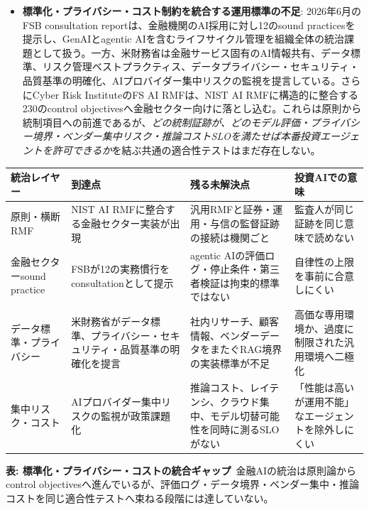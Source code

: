 \begin{itemize}
  \item \textbf{標準化・プライバシー・コスト制約を統合する運用標準の不足}: 2026年6月のFSB consultation report\cite{x07fsbsound2026}は、金融機関のAI採用に対し12のsound practicesを提示し、GenAIとagentic AIを含むライフサイクル管理を組織全体の統治課題として扱う。一方、米財務省は金融サービス固有のAI情報共有、データ標準、リスク管理ベストプラクティス、データプライバシー・セキュリティ・品質基準の明確化、AIプロバイダー集中リスクの監視を提言している\cite{x07treasuryai2024}。さらにCyber Risk InstituteのFS AI RMFは、NIST AI RMFに構造的に整合する230のcontrol objectivesへ金融セクター向けに落とし込む\cite{x07crifsairmf2026}。これらは原則から統制項目への前進であるが、\emph{どの統制証跡が、どのモデル評価・プライバシー境界・ベンダー集中リスク・推論コストSLOを満たせば本番投資エージェントを許可できるか}を結ぶ共通の適合性テストはまだ存在しない。
\end{itemize}

\begin{center}
\footnotesize
\renewcommand{\arraystretch}{1.35}
\begin{tabular}{@{}p{3.0cm}p{4.2cm}p{4.2cm}p{2.6cm}@{}}
\toprule
\textbf{統治レイヤー} & \textbf{到達点} & \textbf{残る未解決点} & \textbf{投資AIでの意味} \\
\midrule
原則・横断RMF & NIST AI RMFに整合する金融セクター実装が出現\cite{x07crifsairmf2026} & 汎用RMFと証券・運用・与信の監督証跡の接続は機関ごと & 監査人が同じ証跡を同じ意味で読めない \\
\addlinespace
金融セクターsound practice & FSBが12の実務慣行をconsultationとして提示\cite{x07fsbsound2026} & agentic AIの評価ログ・停止条件・第三者検証は拘束的標準ではない & 自律性の上限を事前に合意しにくい \\
\addlinespace
データ標準・プライバシー & 米財務省がデータ標準、プライバシー・セキュリティ・品質基準の明確化を提言\cite{x07treasuryai2024} & 社内リサーチ、顧客情報、ベンダーデータをまたぐRAG境界の実装標準が不足 & 高価な専用環境か、過度に制限された汎用環境へ二極化 \\
\addlinespace
集中リスク・コスト & AIプロバイダー集中リスクの監視が政策課題化\cite{x07treasuryai2024} & 推論コスト、レイテンシ、クラウド集中、モデル切替可能性を同時に測るSLOがない & 「性能は高いが運用不能」なエージェントを除外しにくい \\
\bottomrule
\end{tabular}
\end{center}
{\small\color{brandgray}\textbf{表: 標準化・プライバシー・コストの統合ギャップ}\ 金融AIの統治は原則論からcontrol objectivesへ進んでいるが、評価ログ・データ境界・ベンダー集中・推論コストを同じ適合性テストへ束ねる段階には達していない。}

